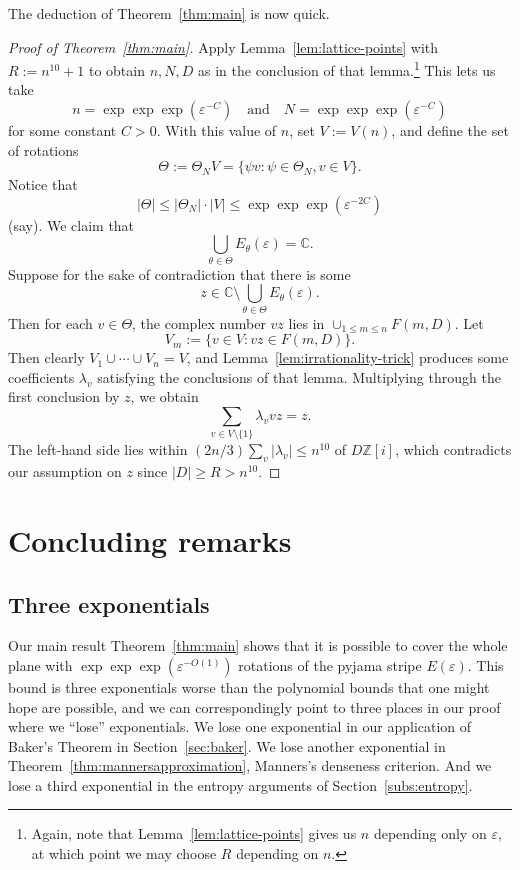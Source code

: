\documentclass[11pt]{amsart}
\theoremstyle{definition}
\begin{document}
The deduction of Theorem~\ref{thm:main} is now quick.

\begin{proof}[Proof of Theorem~\ref{thm:main}]
Apply Lemma~\ref{lem:lattice-points} with $R:=n^{10}+1$ to obtain $n,N,D$ as in the conclusion of that lemma.\footnote{Again, note that Lemma~\ref{lem:lattice-points} gives us $n$ depending only on $\varepsilon$, at which point we may choose $R$ depending on $n$.}  This lets us take
$$n=\exp\exp\exp(\varepsilon^{-C}) \quad \text{and} \quad N=\exp\exp\exp(\varepsilon^{-C})$$
for some constant $C>0$.
With this value of $n$, set $V:=V(n)$, and define the set of rotations
$$\Theta:=\Theta_NV=\{\psi v: \psi \in \Theta_N, v \in V\}.$$
Notice that
$$|\Theta|\leq |\Theta_N| \cdot |V|\leq \exp\exp\exp(\varepsilon^{-2C})$$
(say).
We claim that
$$\bigcup_{\theta \in \Theta}E_{\theta}(\varepsilon)=\mathbb{C}.$$
Suppose for the sake of contradiction that there is some
$$z \in \mathbb{C} \setminus \bigcup_{\theta \in \Theta}E_{\theta}(\varepsilon).$$
Then for each $v \in \Theta$, the complex number $vz$ lies in $\cup_{1 \leq m \leq n}F(m,D)$.  Let $$V_m:=\{v \in V: vz \in F(m,D)\}.$$  Then clearly $V_1 \cup \cdots \cup V_n=V$, and Lemma~\ref{lem:irrationality-trick} produces some coefficients $\lambda_v$ satisfying the conclusions of that lemma. 
 Multiplying through the first conclusion by $z$, we obtain
$$\sum_{v \in V \setminus \{1\}} \lambda_v vz=z.$$
The left-hand side lies within $(2n/3)\sum_v |\lambda_v| \leq n^{10}$ of $D\mathbb{Z}[i]$, which contradicts our assumption on $z$ since $|D| \geq R>n^{10}$.
\end{proof}

\section{Concluding remarks}\label{sec:concluding}

\subsection{Three exponentials}
Our main result Theorem~\ref{thm:main} shows that it is possible to cover the whole plane with $\exp \exp \exp(\varepsilon^{-O(1)})$ rotations of the pyjama stripe $E(\varepsilon)$.  This bound is three exponentials worse than the polynomial bounds that one might hope are possible, and we can correspondingly point to three places in our proof where we ``lose'' exponentials.  We lose one exponential in our application of Baker's Theorem in Section~\ref{sec:baker}.  We lose another exponential in Theorem~\ref{thm:mannersapproximation}, Manners's denseness criterion.  And we lose a third exponential in the entropy arguments of Section~\ref{subs:entropy}.
\end{document}
